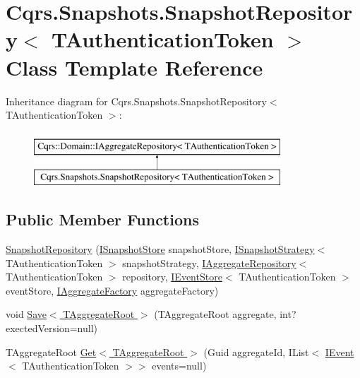 \hypertarget{classCqrs_1_1Snapshots_1_1SnapshotRepository}{}\section{Cqrs.\+Snapshots.\+Snapshot\+Repository$<$ T\+Authentication\+Token $>$ Class Template Reference}
\label{classCqrs_1_1Snapshots_1_1SnapshotRepository}
Inheritance diagram for Cqrs.\+Snapshots.\+Snapshot\+Repository$<$ T\+Authentication\+Token $>$\+:\begin{figure}[H]
\begin{center}
\leavevmode
\includegraphics[height=2.000000cm]{classCqrs_1_1Snapshots_1_1SnapshotRepository}
\end{center}
\end{figure}
\subsection*{Public Member Functions}
\begin{DoxyCompactItemize}
\item 
\hyperlink{classCqrs_1_1Snapshots_1_1SnapshotRepository_afb7a64a747064d1f1fa1f58e36d05d78}{Snapshot\+Repository} (\hyperlink{interfaceCqrs_1_1Snapshots_1_1ISnapshotStore}{I\+Snapshot\+Store} snapshot\+Store, \hyperlink{interfaceCqrs_1_1Snapshots_1_1ISnapshotStrategy}{I\+Snapshot\+Strategy}$<$ T\+Authentication\+Token $>$ snapshot\+Strategy, \hyperlink{interfaceCqrs_1_1Domain_1_1IAggregateRepository}{I\+Aggregate\+Repository}$<$ T\+Authentication\+Token $>$ repository, \hyperlink{interfaceCqrs_1_1Events_1_1IEventStore}{I\+Event\+Store}$<$ T\+Authentication\+Token $>$ event\+Store, \hyperlink{interfaceCqrs_1_1Domain_1_1Factories_1_1IAggregateFactory}{I\+Aggregate\+Factory} aggregate\+Factory)
\item 
void \hyperlink{classCqrs_1_1Snapshots_1_1SnapshotRepository_a4a7484e7754cae876f0c04e640eb80ff}{Save$<$ T\+Aggregate\+Root $>$} (T\+Aggregate\+Root aggregate, int? exected\+Version=null)
\item 
T\+Aggregate\+Root \hyperlink{classCqrs_1_1Snapshots_1_1SnapshotRepository_acdbea47afc87de1da613a6eff3ceef0f}{Get$<$ T\+Aggregate\+Root $>$} (Guid aggregate\+Id, I\+List$<$ \hyperlink{interfaceCqrs_1_1Events_1_1IEvent}{I\+Event}$<$ T\+Authentication\+Token $>$$>$ events=null)
\end{DoxyCompactItemize}


